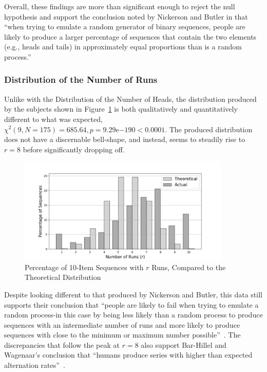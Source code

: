 \noindent Overall, these findings are more than significant enough to reject the null hypothesis and support the conclusion noted by Nickerson and Butler in that ``when trying to emulate a random generator of binary sequences, people are likely to produce a larger percentage of sequences that contain the two elements (e.g., heads and tails) in approximately equal proportions than is a random process.''~\cite{nickerson:2009}

\subsubsection{Distribution of the Number of Runs}
Unlike with the Distribution of the Number of Heads, the distribution produced by the subjects shown in Figure~\ref{distribution_of_the_number_of_runs} is both qualitatively and quantitatively different to what was expected, $\chi^2(9, N=175) = 685.64, p=9.29\mathrm{e}{-190} < 0.0001$. The produced distribution does not have a discernable bell-shape, and instead, seems to steadily rise to $r = 8$ before significantly dropping off. 


\begin{figure}[h]
    \centering
    \includegraphics[width=0.9\textwidth]{images/combined_number_of_runs.jpg}
    \caption{Percentage of 10-Item Sequences with $r$ Runs, Compared to the Theoretical Distribution}
    \label{distribution_of_the_number_of_runs}
\end{figure}

Despite looking different to that produced by Nickerson and Butler, this data still supports their conclusion that ``people are likely to fail when trying to emulate a random process-in this case by being less likely than a random process to produce sequences with an intermediate number of runs and more likely to produce sequences with close to the minimum or maximum number possible''~\cite{nickerson:2009}. The discrepancies that follow the peak at $r = 8$ also support Bar-Hillel and Wagenaar's conclusion that ``humans produce series with higher than expected alternation rates''~\cite{bar-hillel:1991}.

